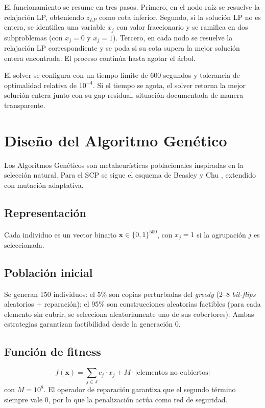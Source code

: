 \documentclass[conference]{IEEEtran}
\begin{document}
El funcionamiento se resume en tres pasos. Primero, en el nodo raíz se resuelve la relajación LP, obteniendo $z_{LP}$ como cota inferior. Segundo, si la solución LP no es entera, se identifica una variable $x_j$ con valor fraccionario y se ramifica en dos subproblemas (con $x_j = 0$ y $x_j = 1$). Tercero, en cada nodo se resuelve la relajación LP correspondiente y se poda si su cota supera la mejor solución entera encontrada. El proceso continúa hasta agotar el árbol.

El solver se configura con un tiempo límite de 600 segundos y tolerancia de optimalidad relativa de $10^{-4}$. Si el tiempo se agota, el solver retorna la mejor solución entera junto con su gap residual, situación documentada de manera transparente.

\section{Diseño del Algoritmo Genético}

Los Algoritmos Genéticos \cite{holland1975, goldberg1989} son metaheurísticas poblacionales inspiradas en la selección natural. Para el SCP se sigue el esquema de Beasley y Chu \cite{beasley1996}, extendido con mutación adaptativa.

\subsection{Representación}
Cada individuo es un vector binario $\mathbf{x} \in \{0,1\}^{500}$, con $x_j=1$ si la agrupación $j$ es seleccionada.

\subsection{Población inicial}
Se generan 150 individuos: el 5\% son copias perturbadas del \textit{greedy} (2--8 \textit{bit-flips} aleatorios + reparación); el 95\% son construcciones aleatorias factibles (para cada elemento sin cubrir, se selecciona aleatoriamente uno de sus cobertores). Ambas estrategias garantizan factibilidad desde la generación 0.

\subsection{Función de fitness}
\begin{equation}
f(\mathbf{x}) = \sum_{j \in J} c_j \cdot x_j + M \cdot |\text{elementos no cubiertos}|
\end{equation}
con $M = 10^8$. El operador de reparación garantiza que el segundo término siempre vale 0, por lo que la penalización actúa como red de seguridad.
\end{document}
